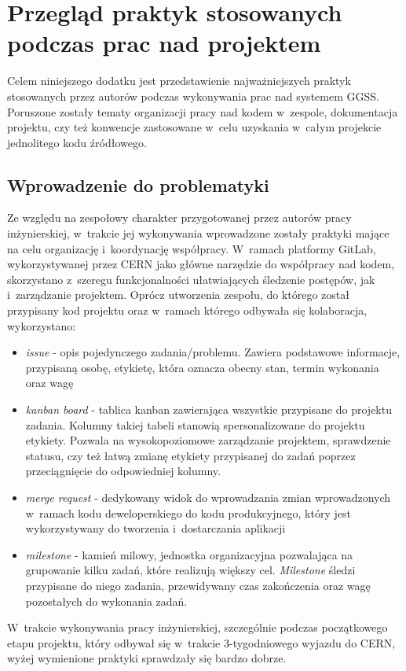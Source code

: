 \appendix
\chapter{Przegląd praktyk stosowanych podczas prac nad projektem}
\label{cha:practices}

Celem niniejszego dodatku jest przedstawienie najważniejszych praktyk stosowanych przez autorów podczas wykonywania prac nad systemem GGSS. Poruszone zostały tematy organizacji pracy nad kodem w~zespole, dokumentacja projektu, czy też konwencje zastosowane w~celu uzyskania w~całym projekcie jednolitego kodu źródłowego.

\section{Wprowadzenie do problematyki}
Ze względu na zespołowy charakter przygotowanej przez autorów pracy inżynierskiej, w~trakcie jej wykonywania wprowadzone zostały praktyki mające na celu organizację i~koordynację współpracy. W~ramach platformy GitLab, wykorzystywanej przez CERN jako główne narzędzie do współpracy nad kodem, skorzystano z~szeregu funkcjonalności ułatwiających śledzenie postępów, jak i~zarządzanie projektem. Oprócz utworzenia zespołu, do którego został przypisany kod projektu oraz w~ramach którego odbywała się kolaboracja, wykorzystano:
\begin{itemize}
\item \emph{issue} - opis pojedynczego zadania/problemu. Zawiera podstawowe informacje, przypisaną osobę, etykietę, która oznacza obecny stan, termin wykonania oraz wagę
\item \emph{kanban board} - tablica kanban zawierająca wszystkie przypisane do projektu zadania. Kolumny takiej tabeli stanowią spersonalizowane do projektu etykiety. Pozwala na wysokopoziomowe zarządzanie projektem, sprawdzenie statusu, czy też łatwą zmianę etykiety przypisanej do zadań poprzez przeciągnięcie do odpowiedniej kolumny. %
\item \emph{merge request} - dedykowany widok do wprowadzania zmian wprowadzonych w~ramach kodu deweloperskiego do kodu produkcyjnego, który jest wykorzystywany do tworzenia i~dostarczania aplikacji
\item \emph{milestone} - kamień milowy, jednostka organizacyjna pozwalająca na grupowanie kilku zadań, które realizują większy cel. \emph{Milestone} śledzi przypisane do niego zadania, przewidywany czas zakończenia oraz wagę pozostałych do wykonania zadań.
\end{itemize}
W~trakcie wykonywania pracy inżynierskiej, szczególnie podczas początkowego etapu projektu, który odbywał się w~trakcie 3-tygodniowego wyjazdu do CERN, wyżej wymienione praktyki sprawdzały się bardzo dobrze.

